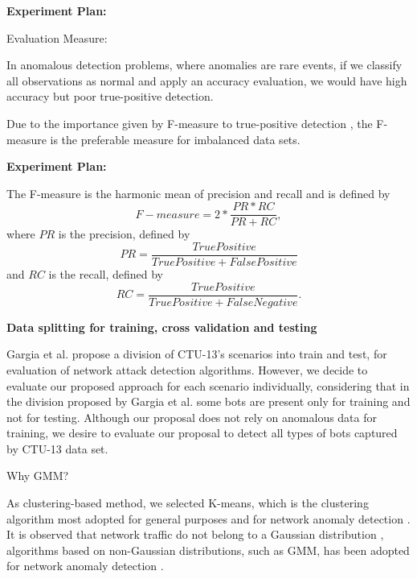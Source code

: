 \documentclass[review]{elsarticle}
\begin{document}
\textbf{Experiment Plan:}

Evaluation Measure:

In anomalous detection problems, where anomalies are rare events, if we classify all observations as normal and apply an accuracy evaluation, we would have high accuracy but poor true-positive detection.

Due to the importance given by F-measure to true-positive detection \cite{powers2011evaluation,moustafa2019holistic}, the F-measure is the preferable measure for imbalanced data sets.

\textbf{Experiment Plan:}

	The F-measure is the harmonic mean of precision and recall and is defined by 
	\begin{equation}\label{eq:eq10}
		F-measure = 2 * \frac{PR * RC}{PR + RC},				
	\end{equation}
	where $PR$ is the precision, defined by 
	\begin{equation}\label{eq:eq11}
		PR = \frac{True Positive}{True Positive + False Positive}
	\end{equation}
	and $RC$ is the recall, defined by 
	\begin{equation}\label{eq:eq12}
		RC = \frac{True Positive}{True Positive + False Negative}.
	\end{equation}


\textbf{Data splitting for training, cross validation and testing}

Gargia et al. \cite{garcia2014empirical} propose a division of CTU-13's scenarios into train and test, for evaluation of network attack detection algorithms. 
However, we decide to evaluate our proposed approach for each scenario individually, considering that in the division proposed by Gargia et al. some bots are present only for training and not for testing. 
Although our proposal does not rely on anomalous data for training, we desire to evaluate our proposal to detect all types of bots captured by CTU-13 data set.

Why GMM?

As clustering-based method, we selected K-means, which is the clustering algorithm most adopted for general purposes and for network anomaly detection \cite{gaddam2007kmeans,moustafa2019holistic}.
It is observed that network traffic do not belong to a Gaussian distribution \cite{benson2010network,moustafa2019holistic}, algorithms based on non-Gaussian distributions, such as GMM, has been adopted for network anomaly detection \cite{moustafa2019holistic}.
\end{document}
